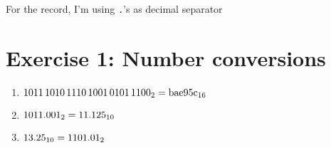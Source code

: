 \documentclass{gadsescript}
\begin{document}
\maketitle

For the record, I'm using \verb|.|'s as decimal separator
\section*{Exercise 1: Number conversions}
\begin{enumerate}[label=\alph*)]
	\item $ \binnum{1011 1010 1110 1001 0101 1100} = \hexnum{bae95c} $
	\item $ \binnum{1011.001} = \decnum{11.125} $
	\item $ \decnum{13.25} = \binnum{1101.01} $
\end{enumerate}
\end{document}
